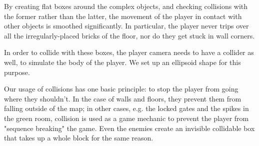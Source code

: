 By creating flat boxes around the complex objects, and checking collisions with the former rather than the latter, the movement of the player in contact with other objects is smoothed significantly. In particular, the player never trips over all the irregularly-placed bricks of the floor, nor do they get stuck in wall corners.

In order to collide with these boxes, the player camera needs to have a collider as well, to simulate the body of the player. We set up an ellipsoid shape for this purpose.

Our usage of collisions has one basic principle: to stop the player from going where they shouldn't. In the case of walls and floors, they prevent them from falling outside of the map; in other cases, e.g. the locked gates and the spikes in the green room, collision is used as a game mechanic to prevent the player from "sequence breaking" the game. Even the enemies create an invisible collidable box that takes up a whole block for the same reason.
